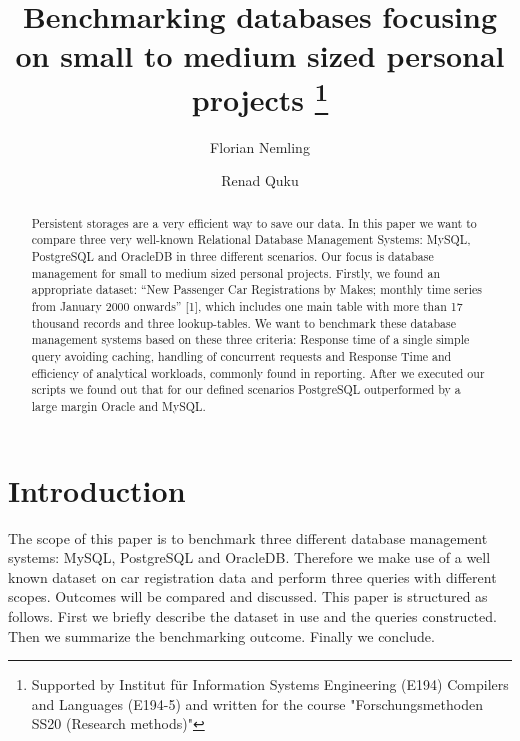 \documentclass[runningheads]{llncs}
\begin{document}
%
\title{Benchmarking databases focusing on small to medium sized personal projects 
\thanks{Supported by Institut für Information Systems Engineering (E194) Compilers and Languages (E194-5)  and written for the course "Forschungsmethoden SS20 (Research methods)"}}
%
%
\author{Florian Nemling \and Renad Quku }
%
%
%
\maketitle              %
%
\begin{abstract}
Persistent storages are a very efficient way to save our data. In this paper we want to compare three very well-known Relational Database Management Systems: MySQL, PostgreSQL and OracleDB in three different scenarios. Our focus is database management for small to medium sized personal projects. Firstly, we found an appropriate dataset: “New Passenger Car Registrations by Makes; monthly time series from January 2000 onwards” [1], which includes one main table with more than 17 thousand records and three lookup-tables. We want to benchmark these database management systems based on these three criteria:  Response time of a single simple query avoiding caching, handling of concurrent requests and Response Time and efficiency of analytical workloads, commonly found in reporting. After we executed our scripts we found out that for our defined scenarios PostgreSQL outperformed by a large margin Oracle and MySQL. 

\end{abstract}
%
%
%
\section{Introduction}

The scope of this paper is to benchmark three different database management systems:  MySQL, PostgreSQL and OracleDB. 
Therefore we make use of a well known dataset on car registration data and perform three queries with different scopes. Outcomes will be compared and discussed. This paper is structured as follows. First we briefly describe the dataset in use and the queries constructed. Then we summarize the benchmarking outcome. Finally we conclude. 
\end{document}
